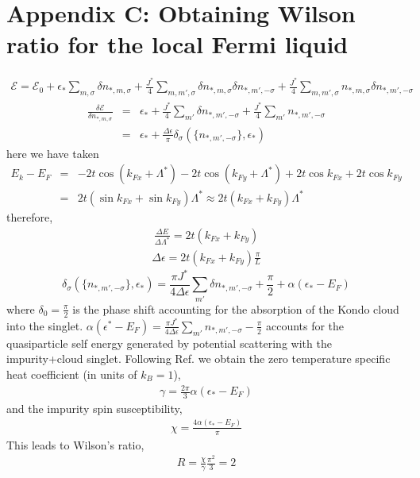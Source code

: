 \documentclass[aps,prl,preprint,groupedaddress]{revtex4-2}
\begin{document}
\section*{Appendix C: Obtaining Wilson ratio for the local Fermi liquid}
\begin{eqnarray}
\mathcal{E}=\mathcal{E}_{0}+\epsilon_{*}\sum_{m,\sigma}\delta n_{*,m,\sigma}+\frac{J^{*}}{4}\sum_{m,m',\sigma}\delta n_{*,m,\sigma}\delta n_{*,m',-\sigma}+\frac{J^{*}}{4}\sum_{m,m',\sigma}n_{*,m,\sigma}\delta n_{*,m',-\sigma}
\end{eqnarray}
\begin{eqnarray}
\frac{\delta\mathcal{E}}{\delta n_{*,m,\sigma}}&=&\epsilon_{*}+\frac{J^{*}}{4}\sum_{m'}\delta n_{*,m',-\sigma}+\frac{J^{*}}{4}\sum_{m'}n_{*,m',-\sigma}\nonumber\\
&=&\epsilon_{*}+\frac{\Delta\epsilon}{\pi}\delta_{\sigma}(\lbrace n_{*,m',-\sigma}\rbrace,\epsilon_{*})
\end{eqnarray}
here we have taken
\begin{eqnarray}
E_{k}-E_{F}&=&-2t\cos(k_{Fx}+\Lambda^{*})-2t\cos(k_{Fy}+\Lambda^{*})+2t\cos k_{Fx}+2t\cos k_{Fy}\nonumber\\
&=&2t(\sin k_{Fx}+\sin k_{Fy})\Lambda^{*}\approx 2t(k_{Fx}+k_{Fy})\Lambda^{*}
\end{eqnarray}
therefore,
\begin{eqnarray}
\frac{\Delta E}{\Delta \Lambda^{*}}=2t(k_{Fx}+k_{Fy})
\end{eqnarray}
\begin{eqnarray}
\Delta \epsilon=2t(k_{Fx}+k_{Fy})\frac{\pi}{L}
\end{eqnarray}
\begin{equation}
\delta_{\sigma}(\lbrace n_{*,m',-\sigma}\rbrace,\epsilon_{*})=\frac{\pi J^{*}}{4\Delta\epsilon}\sum_{m'}\delta n_{*,m',-\sigma}+\frac{\pi}{2}+\alpha(\epsilon_{*}-E_{F})
\end{equation}
where $\delta_{0}=\frac{\pi}{2}$ is the phase shift accounting for the absorption of the Kondo cloud into the singlet. $\alpha(\epsilon^{*}-E_{F})=\frac{\pi J^{*}}{4\Delta\epsilon}\sum_{m'}n_{*,m',-\sigma}-\frac{\pi}{2}$ accounts for the quasiparticle self energy generated by potential scattering with the impurity+cloud singlet\cite{martin-physrevlett.48.362,nozieres1974fermi,coleman2015}.
Following Ref.\cite{nozieres1974fermi,coleman2015} we obtain 
the zero temperature specific heat coefficient (in units of $k_{B}=1$),
\begin{eqnarray}
\gamma = \frac{2\pi}{3}\alpha(\epsilon_{*}-E_{F})
\end{eqnarray} 
and the impurity spin susceptibility,
\begin{eqnarray}
\chi=\frac{4\alpha(\epsilon_{*}-E_{F})}{\pi}
\end{eqnarray}
This leads to Wilson's ratio,
\begin{eqnarray}
R=\frac{\chi}{\gamma}\frac{\pi^{2}}{3}=2
\end{eqnarray}
\end{document}
